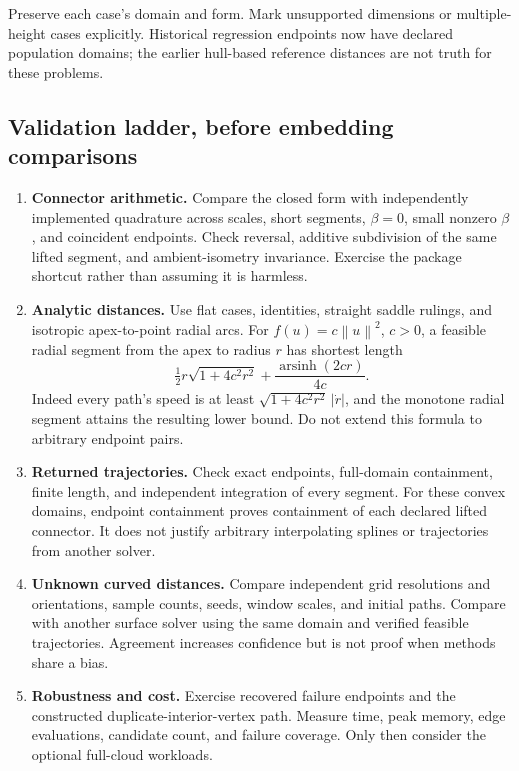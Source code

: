 \documentclass[11pt,letterpaper]{article}
\newcommand{\norm}[1]{\left\lVert#1\right\rVert}
\begin{document}
Preserve each case's domain and form. Mark unsupported dimensions or multiple-height cases explicitly. Historical regression endpoints now have declared population domains; the earlier hull-based reference distances are not truth for these problems.

\subsection{Validation ladder, before embedding comparisons}
\begin{enumerate}
\item \textbf{Connector arithmetic.} Compare the closed form with independently implemented quadrature across scales, short segments, $\beta=0$, small nonzero $\beta$, and coincident endpoints. Check reversal, additive subdivision of the same lifted segment, and ambient-isometry invariance. Exercise the package shortcut rather than assuming it is harmless.
\item \textbf{Analytic distances.} Use flat cases, identities, straight saddle rulings, and isotropic apex-to-point radial arcs. For $f(u)=c\norm{u}^2$, $c>0$, a feasible radial segment from the apex to radius $r$ has shortest length
\[
 \tfrac12r\sqrt{1+4c^2r^2}+\frac{\operatorname{arsinh}(2cr)}{4c}.
\]
Indeed every path's speed is at least $\sqrt{1+4c^2r^2}\,|\dot r|$, and the monotone radial segment attains the resulting lower bound. Do not extend this formula to arbitrary endpoint pairs.
\item \textbf{Returned trajectories.} Check exact endpoints, full-domain containment, finite length, and independent integration of every segment. For these convex domains, endpoint containment proves containment of each declared lifted connector. It does not justify arbitrary interpolating splines or trajectories from another solver.
\item \textbf{Unknown curved distances.} Compare independent grid resolutions and orientations, sample counts, seeds, window scales, and initial paths. Compare with another surface solver using the same domain and verified feasible trajectories. Agreement increases confidence but is not proof when methods share a bias.
\item \textbf{Robustness and cost.} Exercise recovered failure endpoints and the constructed duplicate-interior-vertex path. Measure time, peak memory, edge evaluations, candidate count, and failure coverage. Only then consider the optional full-cloud workloads.
\end{enumerate}
\end{document}

